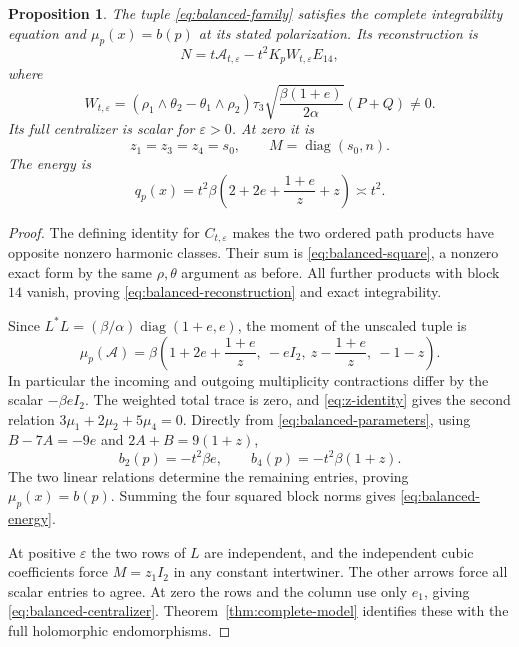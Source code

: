 \documentclass[11pt]{amsart}
\newtheorem{proposition}[theorem]{Proposition}
\theoremstyle{definition}
\theoremstyle{remark}
\newcommand{\diag}{\operatorname{diag}}
\begin{document}
\begin{proposition}\label{prop:balanced-family}
The tuple \eqref{eq:balanced-family} satisfies the complete
integrability equation and $\mu_p(x)=b(p)$ at its stated polarization.
Its reconstruction is
\begin{equation}\label{eq:balanced-reconstruction}
 N=t\mathcal A_{t,\varepsilon}-t^2K_pW_{t,\varepsilon}E_{14},
\end{equation}
where
\begin{equation}\label{eq:balanced-square}
 W_{t,\varepsilon}=(\rho_1\wedge\theta_2-\theta_1\wedge\rho_2)
 \tau_3\sqrt{\frac{\beta(1+e)}{2\alpha}}(P+Q)\ne0.
\end{equation}
Its full centralizer is scalar for $\varepsilon>0$. At zero it is
\begin{equation}\label{eq:balanced-centralizer}
 z_1=z_3=z_4=s_0,\qquad M=\diag(s_0,n).
\end{equation}
The energy is
\begin{equation}\label{eq:balanced-energy}
 q_p(x)=t^2\beta\left(2+2e+\frac{1+e}{z}+z\right)\asymp t^2.
\end{equation}
\end{proposition}
\begin{proof}
The defining identity for $C_{t,\varepsilon}$ makes the two ordered
path products have opposite nonzero harmonic classes. Their sum is
\eqref{eq:balanced-square}, a nonzero exact form by the same
$\rho,\theta$ argument as before. All further products with block
$14$ vanish, proving \eqref{eq:balanced-reconstruction} and exact
integrability.

Since $L^*L=(\beta/\alpha)\diag(1+e,e)$, the moment of the
unscaled tuple is
\begin{equation}\label{eq:balanced-moment}
 \mu_p(\mathcal A)=\beta\left(
 1+2e+\frac{1+e}{z},\ -eI_2,\ z-\frac{1+e}{z},\ -1-z\right).
\end{equation}
In particular the incoming and outgoing multiplicity contractions
differ by the scalar $-\beta eI_2$. The weighted total trace is
zero, and \eqref{eq:z-identity} gives the second relation
$3\mu_1+2\mu_2+5\mu_4=0$. Directly from
\eqref{eq:balanced-parameters}, using $B-7A=-9e$ and
$2A+B=9(1+z)$,
\[
 b_2(p)=-t^2\beta e,\qquad b_4(p)=-t^2\beta(1+z).
\]
The two linear relations determine the remaining entries, proving
$\mu_p(x)=b(p)$. Summing the four squared block norms gives
\eqref{eq:balanced-energy}.

At positive $\varepsilon$ the two rows of $L$ are independent, and
the independent cubic coefficients force $M=z_1I_2$ in any constant
intertwiner. The other arrows force all scalar entries to agree.
At zero the rows and the column use only $e_1$, giving
\eqref{eq:balanced-centralizer}. Theorem~\ref{thm:complete-model}
identifies these with the full holomorphic endomorphisms.
\end{proof}
\end{document}
